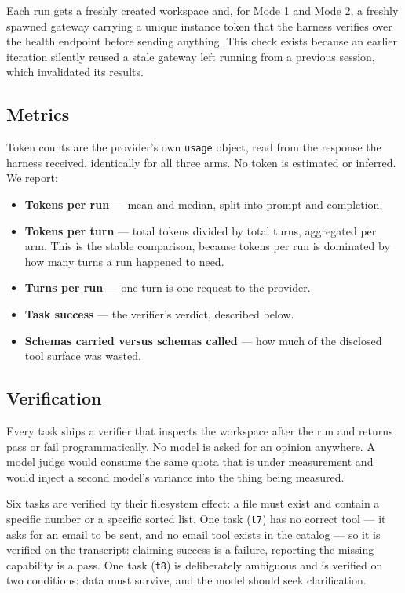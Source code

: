 \documentclass[11pt,a4paper]{article}
\begin{document}
Each run gets a freshly created workspace and, for Mode 1 and Mode 2, a freshly spawned gateway
carrying a unique instance token that the harness verifies over the health endpoint before sending
anything. This check exists because an earlier iteration silently reused a stale gateway left
running from a previous session, which invalidated its results.

\subsection{Metrics}

Token counts are the provider's own \texttt{usage} object, read from the response the harness
received, identically for all three arms. No token is estimated or inferred. We report:

\begin{itemize}[leftmargin=1.4em, itemsep=0.2em]
  \item \textbf{Tokens per run} --- mean and median, split into prompt and completion.
  \item \textbf{Tokens per turn} --- total tokens divided by total turns, aggregated per arm. This is
  the stable comparison, because tokens per run is dominated by how many turns a run happened to
  need.
  \item \textbf{Turns per run} --- one turn is one request to the provider.
  \item \textbf{Task success} --- the verifier's verdict, described below.
  \item \textbf{Schemas carried versus schemas called} --- how much of the disclosed tool surface was
  wasted.
\end{itemize}

\subsection{Verification}

Every task ships a verifier that inspects the workspace after the run and returns pass or fail
programmatically. No model is asked for an opinion anywhere. A model judge would consume the same
quota that is under measurement and would inject a second model's variance into the thing being
measured.

Six tasks are verified by their filesystem effect: a file must exist and contain a specific number
or a specific sorted list. One task (\texttt{t7}) has no correct tool --- it asks for an email to be
sent, and no email tool exists in the catalog --- so it is verified on the transcript: claiming
success is a failure, reporting the missing capability is a pass. One task (\texttt{t8}) is
deliberately ambiguous and is verified on two conditions: data must survive, and the model should
seek clarification.
\end{document}
